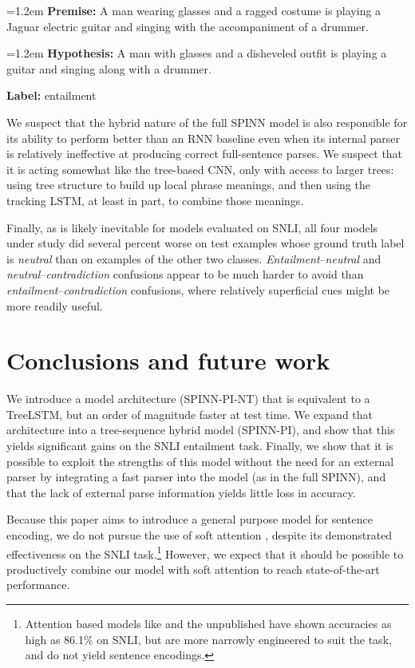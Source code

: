 \documentclass[11pt]{article}
\newcommand{\snli}[3]{{\vspace{0.25em}
{\small \setlength{\parindent}{0.6em} \hangindent=1.2em  \textbf{Premise:} #1\par}\vspace{0.25em}
{\small \setlength{\parindent}{0.6em} \hangindent=1.2em   \textbf{Hypothesis:} #2\par}\vspace{0.25em}
{\small \setlength{\parindent}{0.6em}  \textbf{Label:} #3\par}
}}
\begin{document}
\snli
{A man wearing glasses and a ragged costume is playing a Jaguar electric guitar and singing with the accompaniment of a drummer.}
{A man with glasses and a disheveled outfit is playing a guitar and singing along with a drummer.}
{entailment}

We suspect that the hybrid nature of the full SPINN model is also responsible for its ability to perform better than an RNN baseline even when its internal parser is relatively ineffective at producing correct full-sentence parses. We suspect that it is acting somewhat like the tree-based CNN, only with access to larger trees: using tree structure to build up local phrase meanings, and then using the tracking LSTM, at least in part, to combine those meanings.

Finally, as is likely inevitable for models evaluated on SNLI, all four models under study did several percent worse on test examples whose ground truth label is \textit{neutral} than on examples of the other two classes. \textit{Entailment}--\textit{neutral} and \textit{neutral}--\textit{contradiction} confusions appear to be much harder to avoid than \textit{entailment}--\textit{contradiction} confusions, where relatively superficial cues might be more readily useful.

\section{Conclusions and future work}

We introduce a model architecture (SPINN-PI-NT) that is equivalent to a TreeLSTM, but an order of magnitude faster at test time. We expand that architecture into a tree-sequence hybrid model (SPINN-PI), and show that this yields significant gains on the SNLI entailment task. Finally, we show that it is possible to exploit the strengths of this model without the need for an external parser by integrating a fast parser into the model (as in the full SPINN), and that the lack of external parse information yields little loss in accuracy.

Because this paper aims to introduce a general purpose model for sentence encoding, we do not pursue the use of soft attention \citep{bahdanau2014neural,rocktaschel2015reasoning}, despite its demonstrated effectiveness on the SNLI task.\footnote{Attention based models like \citet{rocktaschel2015reasoning,wang2015learning} and the unpublished \citet{cheng2016long} have shown accuracies as high as 86.1\% on SNLI, but are more narrowly engineered to suit the task, and do not yield sentence encodings.} However, we expect that it should be possible to productively combine our model with soft attention to reach state-of-the-art performance. 
\end{document}
